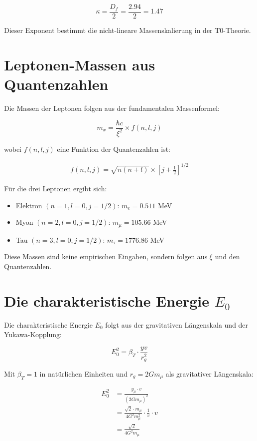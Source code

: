 \documentclass[12pt,a4paper]{article}
\theoremstyle{definition}
\begin{document}
	\begin{equation}
		\kappa = \frac{D_f}{2} = \frac{2.94}{2} = 1.47
	\end{equation}
	
	Dieser Exponent bestimmt die nicht-lineare Massenskalierung in der T0-Theorie.
	
	\section{Leptonen-Massen aus Quantenzahlen}
	
	Die Massen der Leptonen folgen aus der fundamentalen Massenformel:
	
	\begin{equation}
		m_x = \frac{\hbar c}{\xi^2} \times f(n, l, j)
	\end{equation}
	
	wobei $f(n, l, j)$ eine Funktion der Quantenzahlen ist:
	
	\begin{align}
		f(n, l, j) = \sqrt{n(n+l)} \times \left[j + \frac{1}{2}\right]^{1/2}
	\end{align}
	
	F\"ur die drei Leptonen ergibt sich:
	
	\begin{itemize}
		\item Elektron $(n=1, l=0, j=1/2)$: $m_e = 0.511$ MeV
		\item Myon $(n=2, l=0, j=1/2)$: $m_\mu = 105.66$ MeV
		\item Tau $(n=3, l=0, j=1/2)$: $m_\tau = 1776.86$ MeV
	\end{itemize}
	
	Diese Massen sind keine empirischen Eingaben, sondern folgen aus $\xi$ und den Quantenzahlen.
	
	\section{Die charakteristische Energie $E_0$}
	
	Die charakteristische Energie $E_0$ folgt aus der gravitativen L\"angenskala und der Yukawa-Kopplung:
	
	\begin{equation}
		E_0^2 = \beta_T \cdot \frac{yv}{r_g^2}
	\end{equation}
	
	Mit $\beta_T = 1$ in nat\"urlichen Einheiten und $r_g = 2Gm_\mu$ als gravitativer L\"angenskala:
	
	\begin{align}
		E_0^2 &= \frac{y_\mu \cdot v}{(2Gm_\mu)^2}\\
		&= \frac{\sqrt{2} \cdot m_\mu}{4G^2 m_\mu^2} \cdot \frac{1}{v} \cdot v\\
		&= \frac{\sqrt{2}}{4G^2 m_\mu}
	\end{align}
	
\end{document}
